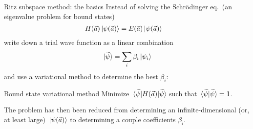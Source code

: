 \documentclass[xcolor=dvipsnames, aspectratio=169]{beamer}
\begin{document}
\begin{frame}{Ritz subspace method: the basics}
Instead of solving the Schr\"odinger eq.\ (an eigenvalue problem for bound states)
\begin{align*}
    H(\vec{a}) \ket*{\psi(\vec{a})} & = E(\vec{a}) \ket*{\psi(\vec{a})}
\end{align*}
write down a \alert{trial wave function} as a linear combination
\begin{align*}
    \ket*{\widetilde{\psi}} = \sum_i \beta_i \ket*{\psi_i}
\end{align*}
and use a \alert{variational method} to determine the best $\beta_i$:

\begin{myblock}[valign=center]{Bound state variational method}
Minimize $\mel*{\widetilde{\psi}}{H(\vec{a})}{\widetilde{\psi}}$ such that $\braket*{\widetilde{\psi}}{\widetilde{\psi}} = 1$.
\end{myblock}

The problem has then been reduced from determining an infinite-dimensional (or, at least large) $\ket*{\psi(\vec{a})}$ to determining a couple coefficients $\beta_i$.
\end{frame}
\end{document}
